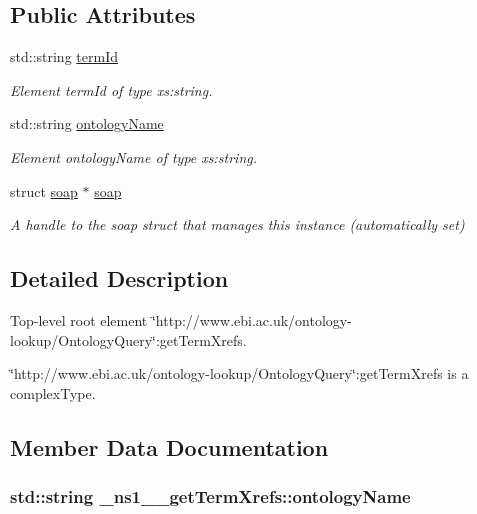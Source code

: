\subsection*{Public Attributes}
\begin{DoxyCompactItemize}
\item 
std::string \hyperlink{class__ns1____getTermXrefs_a1ed9316fbb9681fdcb716e631489b9a2}{termId}
\begin{DoxyCompactList}\small\item\em Element termId of type xs:string. \end{DoxyCompactList}\item 
std::string \hyperlink{class__ns1____getTermXrefs_ad8b6111e2164221d178b5398b123f2ac}{ontologyName}
\begin{DoxyCompactList}\small\item\em Element ontologyName of type xs:string. \end{DoxyCompactList}\item 
\hypertarget{class__ns1____getTermXrefs_a3e78e69730d019253ea0206d82152eb8}{
struct \hyperlink{class__ns1____getTermXrefs_a3e78e69730d019253ea0206d82152eb8}{soap} $\ast$ \hyperlink{class__ns1____getTermXrefs_a3e78e69730d019253ea0206d82152eb8}{soap}}
\label{class__ns1____getTermXrefs_a3e78e69730d019253ea0206d82152eb8}

\begin{DoxyCompactList}\small\item\em A handle to the soap struct that manages this instance (automatically set) \end{DoxyCompactList}\end{DoxyCompactItemize}


\subsection{Detailed Description}
Top-\/level root element \char`\"{}http://www.ebi.ac.uk/ontology-\/lookup/OntologyQuery\char`\"{}:getTermXrefs. 

\char`\"{}http://www.ebi.ac.uk/ontology-\/lookup/OntologyQuery\char`\"{}:getTermXrefs is a complexType. 

\subsection{Member Data Documentation}
\hypertarget{class__ns1____getTermXrefs_ad8b6111e2164221d178b5398b123f2ac}{
\subsubsection[{ontologyName}]{\setlength{\rightskip}{0pt plus 5cm}std::string {\bf \_\-ns1\_\-\_\-getTermXrefs::ontologyName}}}
\label{class__ns1____getTermXrefs_ad8b6111e2164221d178b5398b123f2ac}


